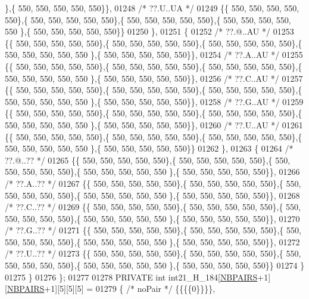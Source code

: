 \begin{DoxyCode}
      \},\{ 550, 550, 550, 550, 550\}\},
01248 \textcolor{comment}{/* ??.U..UA */}
01249 \{\{ 550, 550, 550, 550, 550\},\{ 550, 550, 550, 550, 550\},\{ 550, 550, 550, 550, 550\},\{ 550, 550, 550, 550, 550
      \},\{ 550, 550, 550, 550, 550\}\}
01250 \},
01251 \{
01252 \textcolor{comment}{/* ??.@..AU */}
01253 \{\{ 550, 550, 550, 550, 550\},\{ 550, 550, 550, 550, 550\},\{ 550, 550, 550, 550, 550\},\{ 550, 550, 550, 550, 550
      \},\{ 550, 550, 550, 550, 550\}\},
01254 \textcolor{comment}{/* ??.A..AU */}
01255 \{\{ 550, 550, 550, 550, 550\},\{ 550, 550, 550, 550, 550\},\{ 550, 550, 550, 550, 550\},\{ 550, 550, 550, 550, 550
      \},\{ 550, 550, 550, 550, 550\}\},
01256 \textcolor{comment}{/* ??.C..AU */}
01257 \{\{ 550, 550, 550, 550, 550\},\{ 550, 550, 550, 550, 550\},\{ 550, 550, 550, 550, 550\},\{ 550, 550, 550, 550, 550
      \},\{ 550, 550, 550, 550, 550\}\},
01258 \textcolor{comment}{/* ??.G..AU */}
01259 \{\{ 550, 550, 550, 550, 550\},\{ 550, 550, 550, 550, 550\},\{ 550, 550, 550, 550, 550\},\{ 550, 550, 550, 550, 550
      \},\{ 550, 550, 550, 550, 550\}\},
01260 \textcolor{comment}{/* ??.U..AU */}
01261 \{\{ 550, 550, 550, 550, 550\},\{ 550, 550, 550, 550, 550\},\{ 550, 550, 550, 550, 550\},\{ 550, 550, 550, 550, 550
      \},\{ 550, 550, 550, 550, 550\}\}
01262 \},
01263 \{
01264 \textcolor{comment}{/* ??.@..?? */}
01265 \{\{ 550, 550, 550, 550, 550\},\{ 550, 550, 550, 550, 550\},\{ 550, 550, 550, 550, 550\},\{ 550, 550, 550, 550, 550
      \},\{ 550, 550, 550, 550, 550\}\},
01266 \textcolor{comment}{/* ??.A..?? */}
01267 \{\{ 550, 550, 550, 550, 550\},\{ 550, 550, 550, 550, 550\},\{ 550, 550, 550, 550, 550\},\{ 550, 550, 550, 550, 550
      \},\{ 550, 550, 550, 550, 550\}\},
01268 \textcolor{comment}{/* ??.C..?? */}
01269 \{\{ 550, 550, 550, 550, 550\},\{ 550, 550, 550, 550, 550\},\{ 550, 550, 550, 550, 550\},\{ 550, 550, 550, 550, 550
      \},\{ 550, 550, 550, 550, 550\}\},
01270 \textcolor{comment}{/* ??.G..?? */}
01271 \{\{ 550, 550, 550, 550, 550\},\{ 550, 550, 550, 550, 550\},\{ 550, 550, 550, 550, 550\},\{ 550, 550, 550, 550, 550
      \},\{ 550, 550, 550, 550, 550\}\},
01272 \textcolor{comment}{/* ??.U..?? */}
01273 \{\{ 550, 550, 550, 550, 550\},\{ 550, 550, 550, 550, 550\},\{ 550, 550, 550, 550, 550\},\{ 550, 550, 550, 550, 550
      \},\{ 550, 550, 550, 550, 550\}\}
01274 \}
01275 \}
01276 \};
01277 
01278 PRIVATE \textcolor{keywordtype}{int} int21\_H\_184[\hyperlink{energy__const_8h_a5e75221c779d618eab81e096f37e32ce}{NBPAIRS}+1][\hyperlink{energy__const_8h_a5e75221c779d618eab81e096f37e32ce}{NBPAIRS}+1][5][5][5] =
01279 \{ \textcolor{comment}{/* noPair */} \{\{\{\{0\}\}\}\},

\end{DoxyCode}
